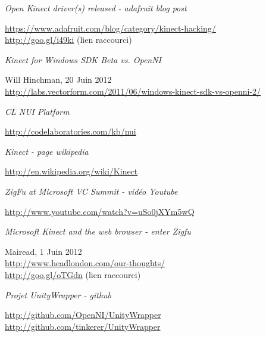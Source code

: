 \begin{thebibliography}{9}
  \emph{Open Kinect driver(s) released - adafruit blog post}\\
  \begin{small}
  \url{https://www.adafruit.com/blog/category/kinect-hacking/}\\
  \url{http://goo.gl/i49ki} (lien raccourci)
  \end{small}

  \emph{Kinect for Windows SDK Beta vs. OpenNI}\\
  \begin{small}
  Will Hinchman, 20 Juin 2012\\
  \url{http://labs.vectorform.com/2011/06/windows-kinect-sdk-vs-openni-2/}
  \end{small}
  
  \emph{CL NUI Platform}\\
  \begin{small}
  \url{http://codelaboratories.com/kb/nui}
  \end{small}
  
  \emph{Kinect - page wikipedia}\\
  \begin{small}
  \url{http://en.wikipedia.org/wiki/Kinect}
  \end{small}
  
  \emph{ZigFu at Microsoft VC Summit - vidéo Youtube}\\
  \begin{small}
  \url{http://www.youtube.com/watch?v=uSo0jXYm5wQ}
  \end{small}
  
  \emph{Microsoft Kinect and the web browser - enter Zigfu}\\
  \begin{small}
  Mairead, 1 Juin 2012\\
  \url{http://www.headlondon.com/our-thoughts/}\\
  \url{http://goo.gl/oTGdn} (lien raccourci)
  \end{small}
  
  \emph{Projet UnityWrapper - github}\\
  \begin{small}
  \url{http://github.com/OpenNI/UnityWrapper}\\
  \url{http://github.com/tinkerer/UnityWrapper}
  \end{small}
  

\end{thebibliography}
